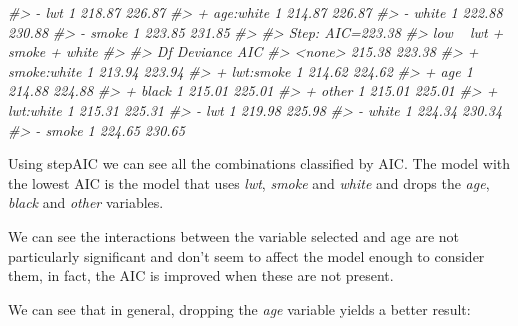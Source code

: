 \documentclass[]{article}
\newenvironment{Shaded}{\begin{snugshade}}{\end{snugshade}}
\newcommand{\CommentTok}[1]{\textcolor[rgb]{0.56,0.35,0.01}{\textit{#1}}}
\newcommand{\NormalTok}[1]{#1}
\newcommand{\OperatorTok}[1]{\textcolor[rgb]{0.81,0.36,0.00}{\textbf{#1}}}
\begin{document}
\begin{Shaded}
\begin{Highlighting}[]
\CommentTok{#> - lwt          1   218.87 226.87}
\CommentTok{#> + age:white    1   214.87 226.87}
\CommentTok{#> - white        1   222.88 230.88}
\CommentTok{#> - smoke        1   223.85 231.85}
\CommentTok{#> }
\CommentTok{#> Step:  AIC=223.38}
\CommentTok{#> low ~ lwt + smoke + white}
\CommentTok{#> }
\CommentTok{#>               Df Deviance    AIC}
\CommentTok{#> <none>             215.38 223.38}
\CommentTok{#> + smoke:white  1   213.94 223.94}
\CommentTok{#> + lwt:smoke    1   214.62 224.62}
\CommentTok{#> + age          1   214.88 224.88}
\CommentTok{#> + black        1   215.01 225.01}
\CommentTok{#> + other        1   215.01 225.01}
\CommentTok{#> + lwt:white    1   215.31 225.31}
\CommentTok{#> - lwt          1   219.98 225.98}
\CommentTok{#> - white        1   224.34 230.34}
\CommentTok{#> - smoke        1   224.65 230.65}
\end{Highlighting}
\end{Shaded}

Using stepAIC we can see all the combinations classified by AIC. The
model with the lowest AIC is the model that uses \emph{lwt},
\emph{smoke} and \emph{white} and drops the \emph{age}, \emph{black} and
\emph{other} variables.

We can see the interactions between the variable selected and age are
not particularly significant and don't seem to affect the model enough
to consider them, in fact, the AIC is improved when these are not
present.

We can see that in general, dropping the \emph{age} variable yields a
better result:

\begin{Shaded}
\end{Shaded}
\end{document}
